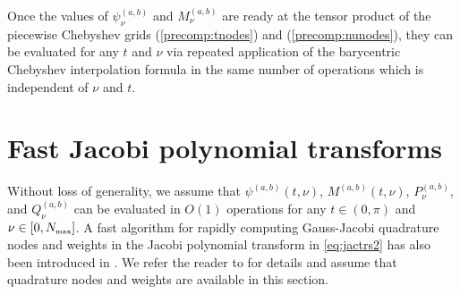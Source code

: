\documentclass[11pt]{article}
\begin{document}
%

Once the values of $\psi_{\nu}^{(a,b)}$ and $M_\nu^{(a,b)}$
are ready at the tensor product
of the piecewise Chebyshev grids (\ref{precomp:tnodes}) and (\ref{precomp:nunodes}),
they can be evaluated for any $t$ and $\nu$ via repeated application
of the barycentric
Chebyshev interpolation formula  in
the same number of operations which
is independent of $\nu$ and $t$.  



\section{Fast Jacobi polynomial transforms}

\label{sec:jt}



Without loss of generality, we assume that $\psi^{(a,b)}(t,\nu)$, $M^{(a,b)}(t,\nu)$, $P_\nu^{(a,b)}$, and $Q_\nu^{(a,b)}$ can be evaluated in $O(1)$ operations for any $t\in (0,\pi)$ and $\nu\in[0,N_{\mbox{\tiny max}} ]$. A fast algorithm for rapidly computing Gauss-Jacobi quadrature nodes and weights in the Jacobi polynomial transform in \eqref{eq:jactrs2} has also been introduced in \cite{Jacobi}. We refer the reader to \cite{Jacobi} for details and assume that quadrature nodes and weights are available in this section.
\end{document}

